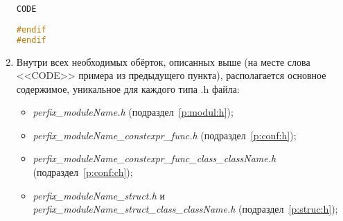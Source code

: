 \begin{enumerate}
\begin{lstlisting}[language=C++, frame=tlBR, basicstyle=\fontsize{10}{10}\ttfamily]
CODE
	
#endif
#endif\end{lstlisting}
	\item Внутри всех необходимых обёрток, описанных выше (на месте слова <<CODE>> примера из предыдущего пункта), располагается основное содержимое, уникальное для каждого типа .h файла:\begin{itemize}
		\item \textit{perfix\_moduleName.h} (подраздел~\ref{p:modul:h});
		\item \textit{perfix\_moduleName\_constexpr\_func.h} (подраздел~\ref{p:conf:h});
		\item \textit{perfix\-\_moduleName\-\_constexpr\-\_func\-\_class\-\_className.h} (подраздел~\ref{p:conf:ch});
		\item \textit{perfix\_moduleName\_struct.h} и \textit{perfix\_moduleName\_struct\_class\_className.h} (подраздел~\ref{p:struc:h});
	\end{itemize}
\end{enumerate}


